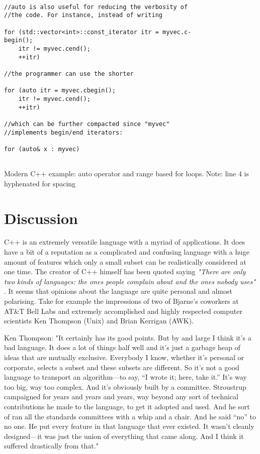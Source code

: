 \documentclass[conference, a4paper]{IEEEtran}
\begin{document}
\begin{listing}[h]
\begin{verbatim}

//auto is also useful for reducing the verbosity of
//the code. For instance, instead of writing

for (std::vector<int>::const_iterator itr = myvec.c-
begin();
    itr != myvec.cend();
    ++itr)

//the programmer can use the shorter

for (auto itr = myvec.cbegin();
    itr != myvec.cend();
    ++itr)

//which can be further compacted since "myvec"
//implements begin/end iterators:

for (auto& x : myvec)
        
    \end{verbatim}

    \caption{Modern C++ example: auto operator and range based for loops. \cite{C++11_2021} Note: line 4 is hyphenated for spacing }
\label{listing:3}
\end{listing}


\section{Discussion}

C++ is an extremely versatile language with a myriad of applications. It does have a bit of a reputation as a complicated and confusing language with a huge amount of features which only a small subset can be realistically considered at one time. The creator of C++ himself has been quoted saying \textit{"There are only two kinds of languages: the ones people complain about and the ones nobody uses"} \cite{cppquotes}. It seems that opinions about the language are quite personal and almost polarising. Take for example the impressions of two of Bjarne's coworkers at AT\&T Bell Labs and extremely accomplished and highly respected computer scientists Ken Thompson (Unix) and Brian Kerrigan (AWK). 

Ken Thompson:
"It certainly has its good points. But by and large I think it’s a bad language. It does a lot of things half well and it’s just a garbage heap of ideas that are mutually exclusive. Everybody I know, whether it’s personal or corporate, selects a subset and these subsets are different. So it’s not a good language to transport an algorithm—to say, “I wrote it; here, take it.” It’s way too big, way too complex. And it’s obviously built by a committee. Stroustrup campaigned for years and years and years, way beyond any sort of technical contributions he made to the language, to get it adopted and used. And he sort of ran all the standards committees with a whip and a chair. And he said “no” to no one. He put every feature in that language that ever existed. It wasn’t cleanly designed—it was just the union of everything that came along. And I think it suffered drastically from that." \cite{Seibel_2009}
\end{document}
